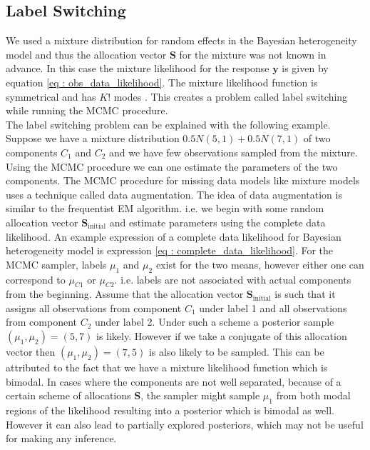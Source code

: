 \subsection{Label Switching}
\label{subsec : label_switching_blmm}
We used a mixture distribution for random effects in the Bayesian heterogeneity model and thus the allocation vector $\boldsymbol{S}$ for the mixture was not known in advance. In this case the mixture likelihood for the response $\boldsymbol{y}$ is given by equation \ref{eq : obs_data_likelihood}. The mixture likelihood function is symmetrical and has $K!$ modes \citep[pg. 44]{fruhwirth-schnatter_finite_2013}. This creates a problem called label switching while running the MCMC procedure.\\

The label switching problem can be explained with the following example. Suppose we have a mixture distribution $0.5N(5,1) + 0.5N(7,1)$ of two components $C_1$ and $C_2$ and we have few observations sampled from the mixture. Using the MCMC procedure we can one estimate the parameters of the two components. The MCMC procedure for missing data models like mixture models uses a technique called data augmentation. The idea of data augmentation is similar to the frequentist EM algorithm. i.e. we begin with some random allocation vector $\boldsymbol{S}_\text{initial}$ and estimate parameters using the complete data likelihood. An example expression of a complete data likelihood for Bayesian heterogeneity model is expression \ref{eq : complete_data_likelihood}. For the MCMC sampler, labels $\mu_1$ and $\mu_2$ exist for the two means, however either one can correspond to $\mu_{C1}$ or $\mu_{C2}$. i.e. labels are not associated with actual components from the beginning. Assume that the allocation vector $\boldsymbol{S}_\text{initial}$ is such that it assigns all observations from component $C_1$ under label 1 and all observations from component $C_2$ under label 2. Under such a scheme a posterior sample $(\mu_1,\mu_2) = (5,7)$ is likely. However if we take a conjugate of this allocation vector then $(\mu_1,\mu_2) = (7,5)$ is also likely to be sampled. This can be attributed to the fact that we have a mixture likelihood function which is bimodal. In cases where the components are not well separated, because of a certain scheme of allocations $\boldsymbol{S}$, the sampler might sample $\mu_1$ from both modal regions of the likelihood resulting into a posterior which is bimodal as well. However it can also lead to partially explored posteriors, which may not be useful for making any inference.

